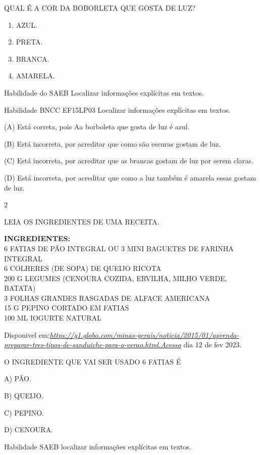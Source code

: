 \begin{escola}
QUAL É A COR DA BOBORLETA QUE GOSTA DE LUZ?

\begin{enumerate}
\def\labelenumi{\Alph{enumi})}
\item
  AZUL.
\item
  PRETA.
\item
  BRANCA.
\item
  AMARELA.
\end{enumerate}

\protect\hypertarget{_heading=h.z337ya}{}{}Habilidade do SAEB Localizar
informações explícitas em textos.

Habilidade BNCC EF15LP03 Localizar informações explícitas em textos.

(A) Está correta, pois Aa borboleta que gosta de luz é azul.

(B) Está incorreta, por acreditar que como são escuras gostam de luz.

(C) Está incorreta, por acreditar que as brancas gostam de luz por serem
claras.

(D) Está incorreta, por acreditar que como a luz também é amarela essas
gostam de luz.

\num{2}

LEIA OS INGREDIENTES DE UMA RECEITA.

\textbf{INGREDIENTES:}\\
6 FATIAS DE PÃO INTEGRAL OU 3 MINI BAGUETES DE FARINHA INTEGRAL\\
6 COLHERES (DE SOPA) DE QUEIJO RICOTA\\
200 G LEGUMES (CENOURA COZIDA, ERVILHA, MILHO VERDE, BATATA)\\
3 FOLHAS GRANDES RASGADAS DE ALFACE AMERICANA\\
15 G PEPINO CORTADO EM FATIAS\\
100 ML IOGURTE NATURAL

Disponivel
em:\href{https://g1.globo.com/minas-gerais/noticia/2015/01/aprenda-preparar-tres-tipos-de-sanduiche-para-o-verao.html.Acesso}{\emph{https://g1.globo.com/minas-gerais/noticia/2015/01/aprenda-preparar-tres-tipos-de-sanduiche-para-o-verao.html.Acesso}}
dia 12 de fev 2023.

O INGREDIENTE QUE VAI SER USADO 6 FATIAS É

A) PÃO.

B) QUEIJO.

C) PEPINO.

D) CENOURA.

Habilidade SAEB localizar informações explícitas em textos.


\end{escola}
